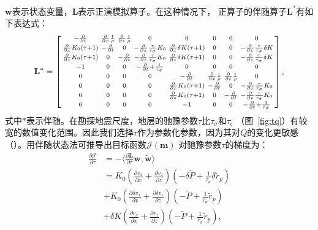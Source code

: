 $\mathbf{w}$表示状态变量，$\mathbf{L}$表示正演模拟算子。在这种情况下，
正算子的伴随算子$\mathbf{L}^\ast$有如下表达式：
    \begin{eqnarray}
        \mathbf{L}^\ast =  
        \begin{bmatrix}
            \begin{smallmatrix}
            -\frac{\partial}{\partial t} &\frac{\partial}{\partial x}\frac{1}{\rho}
            &\frac{\partial}{\partial z}\frac{1}{\rho} &0 &0 &0 &0 &0\cr
            \frac{\partial}{\partial x}K_0(\tau +1) &-\frac{\partial}{\partial t} &0 
            &-\frac{\partial}{\partial x}\frac{\tau}{\tau_\sigma}K_0
            &\frac{\partial}{\partial x}\delta K(\tau+1) &0 &0
            &-\frac{\partial}{\partial x}\frac{\tau}{\tau_\sigma}\delta K \cr
            \frac{\partial}{\partial z}K_0(\tau +1) &0 &-\frac{\partial}{\partial t} 
            &-\frac{\partial}{\partial z}\frac{\tau}{\tau_\sigma}K_0
            &\frac{\partial}{\partial z}\delta K(\tau+1) &0 &0
            &-\frac{\partial}{\partial z}\frac{\tau}{\tau_\sigma}\delta K \cr
            -1 &0 &0 &-\frac{\partial}{\partial t}+\frac{1}{\tau_\sigma} &0 &0 &0 &0\cr
            0 &0 &0 &0 &-\frac{\partial}{\partial t} &\frac{\partial}{\partial
            x}\frac{1}{\rho} &\frac{\partial}{\partial z}\frac{1}{\rho} &0\cr
            0 &0 &0 &0 &\frac{\partial}{\partial x}K_0(\tau +1)
            &-\frac{\partial}{\partial t} &0 &-\frac{\partial}{\partial
            x}\frac{\tau}{\tau_\sigma}K_0 \cr
            0 &0 &0 &0 &\frac{\partial}{\partial z}K_0(\tau +1) &0
            &-\frac{\partial}{\partial t} &-\frac{\partial}{\partial
        z}\frac{\tau}{\tau_\sigma}K_0 \cr
           0 &0 &0 &0 &-1 &0 &0 &-\frac{\partial}{\partial t}+\frac{1}{\tau_\sigma}
            \end{smallmatrix}
        \end{bmatrix},
		\label{eq:ad_operator}
    \end{eqnarray}
式中$\ast$表示伴随。在勘探地震尺度，地层的驰豫参数$\tau$比$\tau_\sigma$和$\tau_\epsilon$
（图~\ref{fig:tq}）有较宽的数值变化范围。因此我们选择$\tau$作为参数化参数，因为其对$Q$的变化更敏感
（）。用伴随状态法可推导出目标函数$\mathcal{J}(\mathbf{m})$
对驰豫参数$\tau$的梯度为：
   \begin{equation}
    \begin{aligned}
        \frac{\partial \mathcal{J}}{\partial \tau} &= -\langle\frac{\partial \mathbf{L}}{\partial\tau}
        \mathbf{w},\tilde{\mathbf{w}} \rangle \\
        &= {K_0(\frac{\partial v_x}{\partial
        x}+\frac{\partial v_z}{\partial
    z})(-\delta\tilde{P}+\frac{1}{\tau_\sigma}\delta\tilde{r}_p)} \\
    &{+K_0(\frac{\partial \delta v_x}{\partial x}+\frac{\partial \delta
        v_z}{\partial z})(-\tilde{P}+\frac{1}{\tau_\sigma}\tilde{r}_p)} \\
        &{+\delta K(\frac{\partial v_x}{\partial x}+\frac{\partial v_z}{\partial
        z})(-\tilde{P}+\frac{1}{\tau_\sigma}\tilde{r}_p)},
    \end{aligned}
    \label{eq:gradient}
    \end{equation}
